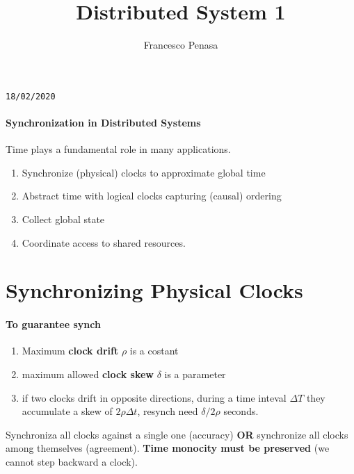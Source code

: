 \documentclass[11pt]{article}
\begin{document}
\author{Francesco Penasa}
\title{Distributed System 1}
\maketitle

\medskip

\texttt{18/02/2020}
\paragraph{Synchronization in Distributed Systems} %
\label{par:synchronization_in_distributed_systems}
Time plays a fundamental role in many applications.
\begin{enumerate}
	\item Synchronize (physical) clocks to approximate global time
	\item Abstract time with logical clocks capturing (causal) ordering
	\item Collect global state
	\item Coordinate access to shared resources.
\end{enumerate}

\section{Synchronizing Physical Clocks} %
\label{sec:synchronizing_physical_clocks}
\paragraph{To guarantee synch} %
\label{par:to_guarantee_synch}
\begin{enumerate}
	\item Maximum \textbf{clock drift} $\rho$ is a costant
	\item maximum allowed \textbf{clock skew} $\delta$ is a parameter
	\item if two clocks drift in opposite directions, during a time inteval $\Delta T$ they accumulate a skew of $2\rho \Delta t$, resynch need $\delta / 2 \rho$ seconds.
\end{enumerate}

Synchroniza all clocks against a single one (accuracy) \textbf{OR} synchronize all clocks among themselves (agreement).
\textbf{Time monocity must be preserved} (we cannot step backward a clock).
\end{document}
